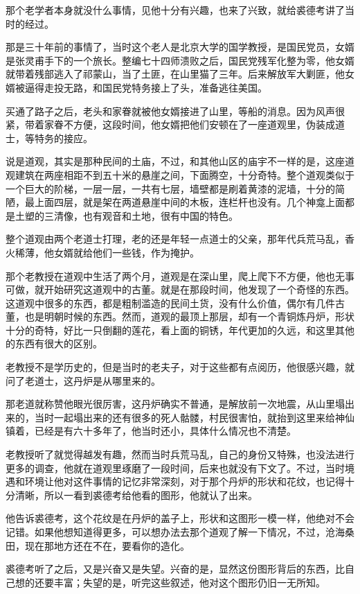 那个老学者本身就没什么事情，见他十分有兴趣，也来了兴致，就给裘德考讲了当时的经过。

那是三十年前的事情了，当时这个老人是北京大学的国学教授，是国民党员，女婿是张灵甫手下的一个旅长。整编七十四师溃败之后，国民党残军化整为零，他女婿就带着残部逃入了祁蒙山，当了土匪，在山里猫了三年。后来解放军大剿匪，他女婿被逼得走投无路，和国民党特务接上了头，准备逃往美国。

买通了路子之后，老头和家眷就被他女婿接进了山里，等船的消息。因为风声很紧，带着家眷不方便，这段时间，他女婿把他们安顿在了一座道观里，伪装成道士，等特务的接应。

说是道观，其实是那种民间的土庙，不过，和其他山区的庙宇不一样的是，这座道观建筑在两座相距不到五十米的悬崖之间，下面腾空，十分奇特。整个道观类似于一个巨大的阶梯，一层一层，一共有七层，墙壁都是刷着黄漆的泥墙，十分的简陋，最上面四层，就是架在两道悬崖中间的木板，连栏杆也没有。几个神龛上面都是土塑的三清像，也有观音和土地，很有中国的特色。

整个道观由两个老道士打理，老的还是年轻一点道士的父亲，那年代兵荒马乱，香火稀薄，他女婿就给他们一些钱，作为掩护。

那个老教授在道观中生活了两个月，道观是在深山里，爬上爬下不方便，他也无事可做，就开始研究这道观中的古董。就是在那段时间，他发现了一个奇怪的东西。这道观中很多的东西，都是粗制滥造的民间土货，没有什么价值，偶尔有几件古董，也是明朝时候的东西。然而，道观的最顶上那层，却有一个青铜炼丹炉，形状十分的奇特，好比一只倒翻的莲花，看上面的铜锈，年代更加的久远，和这里其他的东西有很大的区别。

老教授不是学历史的，但是当时的老夫子，对于这些都有点阅历，他很感兴趣，就问了老道士，这丹炉是从哪里来的。

那老道就称赞他眼光很厉害，这丹炉确实不普通，是解放前一次地震，从山里塌出来的，当时一起塌出来的还有很多的死人骷髅，村民很害怕，就抬到这里来给神仙镇着，已经是有六十多年了，他当时还小，具体什么情况也不清楚。

老教授听了就觉得越发有趣，然而当时兵荒马乱，自己的身份又特殊，也没法进行更多的调查，他就在道观里琢磨了一段时间，后来也就没有下文了。不过，当时境遇和环境让他对这件事情的记忆非常深刻，对于那个丹炉的形状和花纹，也记得十分清晰，所以一看到裘德考给他看的图形，他就认了出来。

他告诉裘德考，这个花纹是在丹炉的盖子上，形状和这图形一模一样，他绝对不会记错。如果他想知道得更多，可以想办法去那个道观了解一下情况，不过，沧海桑田，现在那地方还在不在，要看你的造化。

裘德考听了之后，又是兴奋又是失望。兴奋的是，显然这份图形背后的东西，比自己想的还要丰富；失望的是，听完这些叙述，他对这个图形仍旧一无所知。


